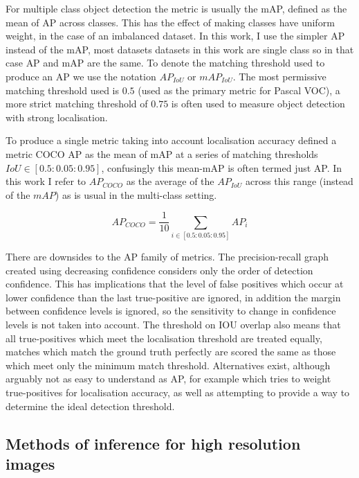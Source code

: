For multiple class object detection the metric is usually the \gls{mAP}, defined as the mean of \gls{AP} across classes. This has the effect of making classes have uniform weight, in the case of an imbalanced dataset.  In this work, I use the simpler \gls{AP} instead of the \gls{mAP}, most datasets datasets in this work are single class so in that case \gls{AP} and \gls{mAP} are the same. To denote the matching threshold used to produce an \gls{AP} we use the notation $AP_{IoU}$ or $mAP_{IoU}$. The most permissive matching threshold used is $0.5$ (used as the primary metric for Pascal VOC), a more strict matching threshold of $0.75$ is often used to measure object detection with strong localisation.

To produce a single metric taking into account localisation accuracy \cite{Lin2014} defined a metric COCO \gls{AP} as the mean of \gls{mAP} at a series of matching thresholds $ IoU \in [0.5 : 0.05 : 0.95] $, confusingly this mean-\gls{mAP} is often termed just \gls{AP}. In this work I refer to $AP_{COCO}$ as the average of the $AP_{IoU}$ across this range (instead of the $mAP$) as is usual in the multi-class setting.

\begin{equation}
AP_{COCO} = \frac{1}{10}\sum_{i \in [0.5 : 0.05 : 0.95]}AP_{i}
\label{eq:ap_coco}
\end{equation}

There are downsides to the \gls{AP} family of metrics. The precision-recall graph created using decreasing confidence considers only the order of detection confidence. This has implications that the level of false positives which occur at lower confidence than the last true-positive are ignored, in addition the margin between confidence levels is ignored, so the sensitivity to change in confidence levels is not taken into account. The threshold on \gls{IOU} overlap also means that all true-positives which meet the localisation threshold are treated equally, matches which match the ground truth perfectly are scored the same as those which meet only the minimum match threshold. Alternatives exist, although arguably not as easy to understand as \gls{AP}, for example \cite{Oksuz2018} which tries to weight true-positives for localisation accuracy, as well as attempting to provide a way to determine the ideal detection threshold.


\subsection{Methods of inference for high resolution images}
\label{sec:highres_inference}

